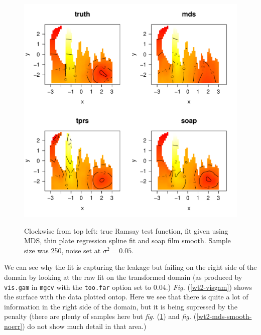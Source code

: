 \documentclass[a4paper,10pt]{article}
\newcommand{\fig}[1]{\emph{fig.} (\ref{#1})}
\newcommand{\Fig}[1]{\emph{Fig.} (\ref{#1})}
\begin{document}
\begin{figure}
\centering
\includegraphics[width=6in]{figs/wt2-mds-smooth-err.pdf}\\
\caption{Clockwise from top left: true Ramsay test function, fit given using MDS, thin plate regression spline fit and soap film smooth. Sample size was 250, noise set at $\sigma^2=0.05$.}
\label{wt2-mds-smooth-err}
\end{figure}

We can see why the fit is capturing the leakage but failing on the right side of the domain by looking at the raw fit on the transformed domain (as produced by \texttt{vis.gam} in \texttt{mgcv} with the \texttt{too.far} option set to 0.04.) \Fig{wt2-visgam} shows the surface with the data plotted ontop. Here we see that there is quite a lot of information in the right side of the domain, but it is being supressed by the penalty (there are plenty of samples here but \fig{wt2-mds-smooth-err} and \fig{wt2-mds-smooth-noerr} do not show much detail in that area.)
\end{document}
